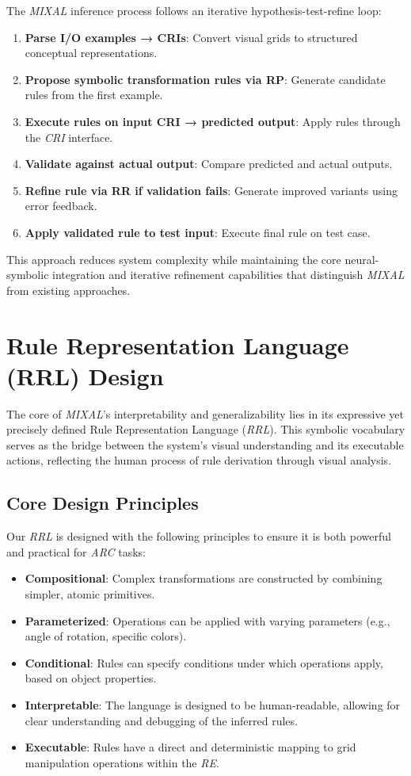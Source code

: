 \documentclass[12pt]{article}
\newcommand{\arc}{\textit{ARC}}
\newcommand{\MIXAL}{\textit{MIXAL}}
\newcommand{\re}{\textit{RE}}
\newcommand{\cri}{\textit{CRI}}
\newcommand{\rrl}{\textit{RRL}}
\begin{document}
The \MIXAL{} inference process follows an iterative hypothesis-test-refine loop:

\begin{enumerate}[noitemsep,topsep=0pt]
\item\textbf{Parse I/O examples → CRIs}: Convert visual grids to structured conceptual representations.
\item\textbf{Propose symbolic transformation rules via RP}: Generate candidate rules from the first example.
\item\textbf{Execute rules on input CRI → predicted output}: Apply rules through the \cri{} interface.
\item\textbf{Validate against actual output}: Compare predicted and actual outputs.
\item\textbf{Refine rule via RR if validation fails}: Generate improved variants using error feedback.
\item\textbf{Apply validated rule to test input}: Execute final rule on test case.
\end{enumerate}

This approach reduces system complexity while maintaining the core neural-symbolic integration and iterative refinement capabilities that distinguish \MIXAL{} from existing approaches.

\section{Rule Representation Language (RRL) Design}

The core of \MIXAL{}'s interpretability and generalizability lies in its expressive yet precisely defined Rule Representation Language (\rrl{}). This symbolic vocabulary serves as the bridge between the system's visual understanding and its executable actions, reflecting the human process of rule derivation through visual analysis.

\subsection{Core Design Principles}
Our \rrl{} is designed with the following principles to ensure it is both powerful and practical for \arc{} tasks:
\begin{itemize}[noitemsep,topsep=0pt]
  \item \textbf{Compositional}: Complex transformations are constructed by combining simpler, atomic primitives.
  \item \textbf{Parameterized}: Operations can be applied with varying parameters (e.g., angle of rotation, specific colors).
  \item \textbf{Conditional}: Rules can specify conditions under which operations apply, based on object properties.
  \item \textbf{Interpretable}: The language is designed to be human-readable, allowing for clear understanding and debugging of the inferred rules.
  \item \textbf{Executable}: Rules have a direct and deterministic mapping to grid manipulation operations within the \re{}.
\end{itemize}
\end{document}
